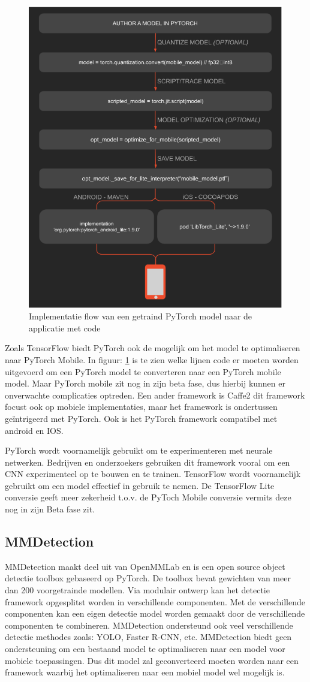 \begin{figure}[!ht]
    \centering
 	\includegraphics[width=0.5\linewidth]{fig/PyTorch-mobile.png}
 	\caption{Implementatie flow van een getraind PyTorch model naar de applicatie met code}
 	\label{fig:pt_mobile}
\end{figure}

Zoals TensorFlow biedt PyTorch ook de mogelijk om het model te optimaliseren naar PyTorch Mobile.
In figuur: \ref{fig:pt_mobile} is te zien welke lijnen code er moeten worden uitgevoerd om een PyTorch model te converteren naar een PyTorch mobile model.
Maar PyTorch mobile zit nog in zijn beta fase, dus hierbij kunnen er onverwachte complicaties optreden.
Een ander framework is Caffe2 dit framework focust ook op mobiele implementaties, maar het framework is ondertussen ge\"intrigeerd met PyTorch.
Ook is het PyTorch framework compatibel met android en IOS.

PyTorch wordt voornamelijk gebruikt om te experimenteren met neurale netwerken.
Bedrijven en onderzoekers gebruiken dit framework vooral om een CNN experimenteel op te bouwen en te trainen.
TensorFlow wordt voornamelijk gebruikt om een model effectief in gebruik te nemen.
De TensorFlow Lite conversie geeft meer zekerheid t.o.v. de PyToch Mobile conversie vermits deze nog in zijn Beta fase zit.

\subsection{MMDetection}
MMDetection maakt deel uit van OpenMMLab en is een open source object detectie toolbox gebaseerd op PyTorch.
De toolbox bevat gewichten van meer dan 200 voorgetrainde modellen.
Via modulair ontwerp kan het detectie framework opgesplitst worden in verschillende componenten.
Met de verschillende componenten kan een eigen detectie model worden gemaakt door de verschillende componenten te combineren.
MMDetection ondersteund ook veel verschillende detectie methodes zoals: YOLO, Faster R-CNN, etc.
MMDetection biedt geen ondersteuning om een bestaand model te optimaliseren naar een model voor mobiele toepassingen.
Dus dit model zal geconverteerd moeten worden naar een framework waarbij het optimaliseren naar een mobiel model wel mogelijk is.

